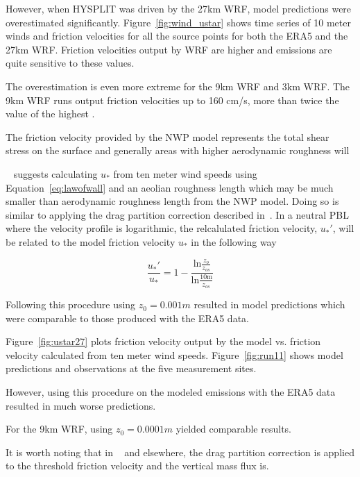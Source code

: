 However, when HYSPLIT was driven by the 27km WRF, model predictions were overestimated significantly. 
Figure~\ref{fig:wind_ustar} shows time series of 10 meter winds and friction velocities for all the source points for both the ERA5
and the 27km WRF. Friction velocities output by WRF are higher and emissions are quite sensitive to these values. 

The overestimation is even more extreme for the 9km WRF  and 3km WRF.
The 9km WRF runs output friction velocities up to 160 cm/s, more than twice the value of the highest .

The friction velocity provided by the NWP model represents the total shear stress on the surface and generally areas with higher aerodynamic roughness will 



~\cite{Darmenova} suggests calculating $u_*$ from ten meter wind speeds using Equation~\ref{eq:lawofwall} and an aeolian roughness length which may be much smaller than aerodynamic roughness length from the NWP model.  Doing so is similar to applying the 
drag partition correction described in~\citep{Marticorena97,MacKinnon04,Darmenova09}. 
In a neutral PBL where the velocity profile is logarithmic, the relcalulated friction velocity, $u_*'$, will be related to the model friction velocity $u_*$ in the following way

$$\frac{u_*'}{u_*} = 1 - \frac{\mathrm{ln}\frac{z_o}{z_{os}}}{\mathrm{ln}\frac{10\mathrm{m}}{z_{os}}} $$


Following this procedure using  $z_0=0.001m$  resulted in model predictions which were comparable to those produced with the ERA5 data. 

Figure~\ref{fig:ustar27} plots friction velocity output by the model vs. friction velocity calculated from ten meter wind speeds. Figure~\ref{fig:run11} shows model predictions and observations at the five measurement sites.

However, using this procedure on the modeled emissions with the ERA5 data resulted in much worse predictions.

For the 9km WRF, using $z_0=0.0001m$ yielded  comparable results.

It is worth noting that in ~\cite{Darmenova09} and elsewhere, the drag partition correction is applied to the threshold friction velocity and the vertical mass flux is.


